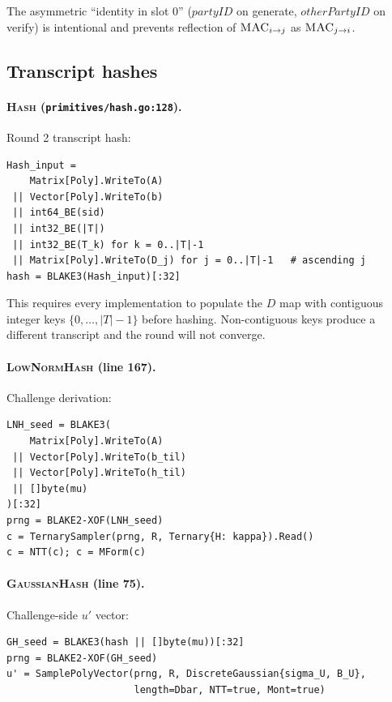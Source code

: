The asymmetric ``identity in slot 0'' ($\mathit{partyID}$ on generate, $\mathit{otherPartyID}$ on verify) is intentional and prevents reflection of $\textsc{MAC}_{i \to j}$ as $\textsc{MAC}_{j \to i}$.

\subsection{Transcript hashes}

\paragraph{\textsc{Hash} (\texttt{primitives/hash.go:128}).} Round 2 transcript hash:

\begin{lstlisting}
Hash_input =
    Matrix[Poly].WriteTo(A)
 || Vector[Poly].WriteTo(b)
 || int64_BE(sid)
 || int32_BE(|T|)
 || int32_BE(T_k) for k = 0..|T|-1
 || Matrix[Poly].WriteTo(D_j) for j = 0..|T|-1   # ascending j
hash = BLAKE3(Hash_input)[:32]
\end{lstlisting}

This requires every implementation to populate the $D$ map with contiguous integer keys $\{0, \ldots, |T|-1\}$ before hashing. Non-contiguous keys produce a different transcript and the round will not converge.

\paragraph{\textsc{LowNormHash} (line 167).} Challenge derivation:

\begin{lstlisting}
LNH_seed = BLAKE3(
    Matrix[Poly].WriteTo(A)
 || Vector[Poly].WriteTo(b_til)
 || Vector[Poly].WriteTo(h_til)
 || []byte(mu)
)[:32]
prng = BLAKE2-XOF(LNH_seed)
c = TernarySampler(prng, R, Ternary{H: kappa}).Read()
c = NTT(c); c = MForm(c)
\end{lstlisting}

\paragraph{\textsc{GaussianHash} (line 75).} Challenge-side $u'$ vector:

\begin{lstlisting}
GH_seed = BLAKE3(hash || []byte(mu))[:32]
prng = BLAKE2-XOF(GH_seed)
u' = SamplePolyVector(prng, R, DiscreteGaussian{sigma_U, B_U},
                      length=Dbar, NTT=true, Mont=true)
\end{lstlisting}


